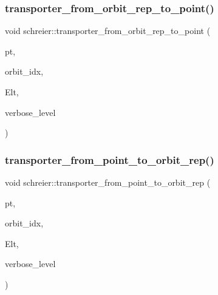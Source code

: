 \subsubsection{\texorpdfstring{transporter\+\_\+from\+\_\+orbit\+\_\+rep\+\_\+to\+\_\+point()}{transporter\_from\_orbit\_rep\_to\_point()}}
{\footnotesize\ttfamily void schreier\+::transporter\+\_\+from\+\_\+orbit\+\_\+rep\+\_\+to\+\_\+point (\begin{DoxyParamCaption}\item[{\mbox{\hyperlink{galois_8h_a09fddde158a3a20bd2dcadb609de11dc}{I\+NT}}}]{pt,  }\item[{\mbox{\hyperlink{galois_8h_a09fddde158a3a20bd2dcadb609de11dc}{I\+NT}} \&}]{orbit\+\_\+idx,  }\item[{\mbox{\hyperlink{galois_8h_a09fddde158a3a20bd2dcadb609de11dc}{I\+NT}} $\ast$}]{Elt,  }\item[{\mbox{\hyperlink{galois_8h_a09fddde158a3a20bd2dcadb609de11dc}{I\+NT}}}]{verbose\+\_\+level }\end{DoxyParamCaption})}

\mbox{\label{classschreier_a744c4deba9028908bc955ddfbfd6f424}} 
\subsubsection{\texorpdfstring{transporter\+\_\+from\+\_\+point\+\_\+to\+\_\+orbit\+\_\+rep()}{transporter\_from\_point\_to\_orbit\_rep()}}
{\footnotesize\ttfamily void schreier\+::transporter\+\_\+from\+\_\+point\+\_\+to\+\_\+orbit\+\_\+rep (\begin{DoxyParamCaption}\item[{\mbox{\hyperlink{galois_8h_a09fddde158a3a20bd2dcadb609de11dc}{I\+NT}}}]{pt,  }\item[{\mbox{\hyperlink{galois_8h_a09fddde158a3a20bd2dcadb609de11dc}{I\+NT}} \&}]{orbit\+\_\+idx,  }\item[{\mbox{\hyperlink{galois_8h_a09fddde158a3a20bd2dcadb609de11dc}{I\+NT}} $\ast$}]{Elt,  }\item[{\mbox{\hyperlink{galois_8h_a09fddde158a3a20bd2dcadb609de11dc}{I\+NT}}}]{verbose\+\_\+level }\end{DoxyParamCaption})}

